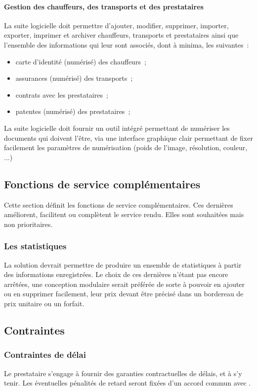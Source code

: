 \paragraph{Gestion des chauffeurs, des transports et des prestataires}
La suite logicielle doit permettre d'ajouter, modifier, supprimer, importer, exporter, imprimer et archiver chauffeurs, transports et prestataires ainsi que l'ensemble des informations qui leur sont associés, dont à minima, les suivantes~:
\begin{itemize}
	\item carte d'identité (numérisé) des chauffeurs~;
	\item assurances (numérisé) des transports~;
	\item contrats avec les prestataires~;
	\item patentes (numérisé) des prestataires~;
\end{itemize}
\begin{constraint}
La suite logicielle doit fournir un outil intégré permettant de numériser les documents qui doivent l'être, via une interface graphique clair permettant de fixer facilement les paramètres de numérisation (poids de l'image, résolution, couleur, ...)
\end{constraint}

\subsection{Fonctions de service complémentaires}
Cette section définit les fonctions de service complémentaires. Ces dernières améliorent, facilitent ou complètent le service rendu. Elles sont souhaitées mais non prioritaires.

\subsubsection{Les statistiques}
La solution devrait permettre de produire un ensemble de statistiques à partir des informations enregistrées. Le choix de ces dernières n'étant pas encore arrêtées, une conception modulaire serait préférée de sorte à pouvoir en ajouter ou en supprimer facilement, leur prix devant être précisé dans un bordereau de prix unitaire ou un forfait.

\subsection{Contraintes}

\subsubsection{Contraintes de délai}
Le prestataire s'engage à fournir des garanties contractuelles de délais, et à s'y tenir. Les éventuelles pénalités de retard seront fixées d'un accord commun avec \mo.

